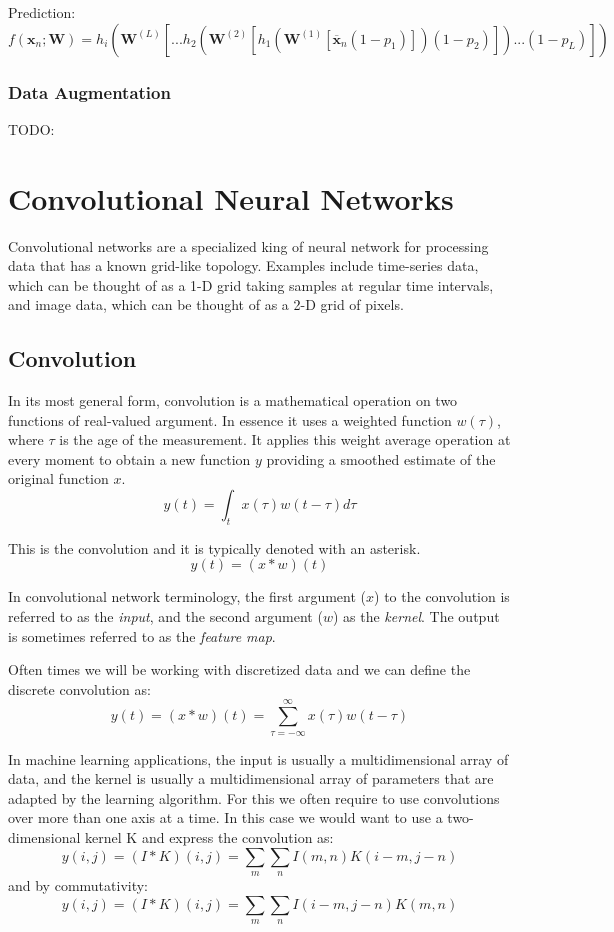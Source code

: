\documentclass[12pt]{article}
\begin{document}
            Prediction:
            $$ f(\boldsymbol{x}_n; \boldsymbol{W}) = h_i(\boldsymbol{W}^{(L)}
            [...h_2(\boldsymbol{W}^{(2)}[h_1(\boldsymbol{W}^{(1)}[\overline{\boldsymbol{x}}_n (1-p_1)])(1-p_2)])...
            (1-p_L)]) $$        
        
        \subsubsection{Data Augmentation} \label{sec:DataAugmentation}
            TODO:

\section{Convolutional Neural Networks} \label{sec:CNN}
    Convolutional networks are a specialized king of neural network for processing data that has a known grid-like
    topology. Examples include time-series data, which can be thought of as a 1-D grid taking samples at regular time
    intervals, and image data, which can be thought of as a 2-D grid of pixels. 

    \subsection{Convolution}
        In its most general form, convolution is a mathematical operation on two functions of real-valued argument. In
        essence it uses a weighted function $w(\tau)$, where $\tau$ is the age of the measurement. It applies this weight
        average operation at every moment to obtain a new function $y$ providing a smoothed estimate of the original
        function $x$.
        $$ y(t) = \int_t x(\tau)w(t - \tau)d\tau $$

        This is the convolution and it is typically denoted with an asterisk.
        $$ y(t) = (x * w)(t) $$

        In convolutional network terminology, the first argument ($x$) to the convolution is referred to as the \textit{input},
        and the second argument ($w$) as the \textit{kernel}. The output is sometimes referred to as the \textit{feature
        map}.

        Often times we will be working with discretized data and we can define the discrete convolution as:
        $$ y(t) = (x * w)(t) = \sum_{\tau = -\infty}^{\infty} x(\tau)w(t-\tau) $$

        In machine learning applications, the input is usually a multidimensional array of data, and the kernel is
        usually a multidimensional array of parameters that are adapted by the learning algorithm. For this we often
        require to use convolutions over more than one axis at a time. In this case we would want to use a
        two-dimensional kernel K and express the convolution as:
        $$ y(i,j) = (I * K)(i,j) = \sum_m \sum_n I(m, n)K(i-m,j-n) $$
        and by commutativity:
        $$ y(i,j) = (I * K)(i,j) = \sum_m \sum_n I(i-m, j-n)K(m,n) $$
\end{document}
